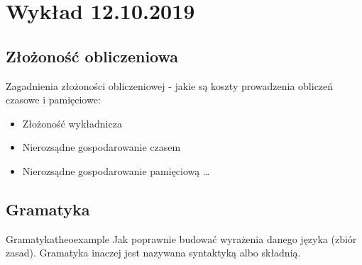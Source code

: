 \chapter{Wykład 12.10.2019}
\label{ch:wyklad1}

\section{Złożoność obliczeniowa}

	Zagadnienia złożoności obliczeniowej
	- jakie są koszty prowadzenia obliczeń czasowe i pamięciowe:
	\begin{itemize}
	  \item Złożoność wykładnicza
	  \item Nierozsądne gospodarowanie czasem
	  \item Nierozsądne gospodarowanie pamięciową \ldots
	\end{itemize}

\section{Gramatyka}

	\begin{mytheo}{Gramatyka}{theoexample}
		Jak poprawnie budować wyrażenia danego języka (zbiór zasad).
		Gramatyka inaczej jest nazywana syntaktyką albo składnią.
	\end{mytheo}
	
	
	
